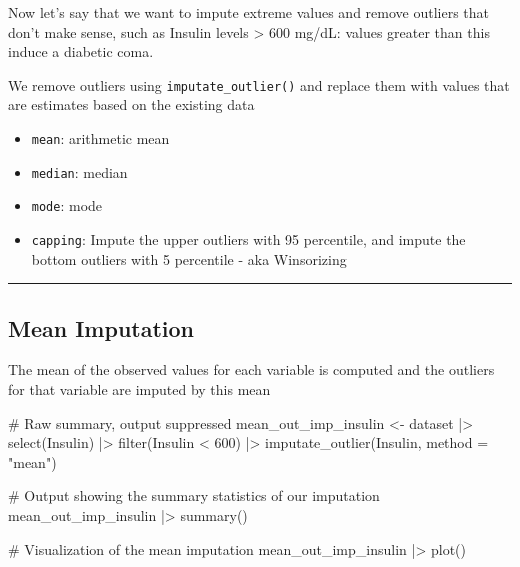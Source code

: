 \documentclass[
  letterpaper,
  DIV=11,
  numbers=noendperiod]{scrreprt}
\newenvironment{Shaded}{\begin{snugshade}}{\end{snugshade}}
\newcommand{\AttributeTok}[1]{\textcolor[rgb]{0.40,0.45,0.13}{#1}}
\newcommand{\CommentTok}[1]{\textcolor[rgb]{0.37,0.37,0.37}{#1}}
\newcommand{\DecValTok}[1]{\textcolor[rgb]{0.68,0.00,0.00}{#1}}
\newcommand{\FunctionTok}[1]{\textcolor[rgb]{0.28,0.35,0.67}{#1}}
\newcommand{\NormalTok}[1]{\textcolor[rgb]{0.00,0.23,0.31}{#1}}
\newcommand{\OtherTok}[1]{\textcolor[rgb]{0.00,0.23,0.31}{#1}}
\newcommand{\SpecialCharTok}[1]{\textcolor[rgb]{0.37,0.37,0.37}{#1}}
\newcommand{\StringTok}[1]{\textcolor[rgb]{0.13,0.47,0.30}{#1}}
\begin{document}
Now let's say that we want to impute extreme values and remove outliers
that don't make sense, such as Insulin levels \textgreater{} 600 mg/dL:
values greater than this induce a diabetic coma.

We remove outliers using \texttt{imputate\_outlier()} and replace them
with values that are estimates based on the existing data

\begin{itemize}
\item
  \texttt{mean}: arithmetic mean
\item
  \texttt{median}: median
\item
  \texttt{mode}: mode
\item
  \texttt{capping}: Impute the upper outliers with 95 percentile, and
  impute the bottom outliers with 5 percentile - aka Winsorizing
\end{itemize}

\begin{center}\rule{0.5\linewidth}{0.5pt}\end{center}

\hypertarget{mean-imputation}{%
\subsection{Mean Imputation}\label{mean-imputation}}

The mean of the observed values for each variable is computed and the
outliers for that variable are imputed by this mean

\begin{Shaded}
\begin{Highlighting}[]
\CommentTok{\# Raw summary, output suppressed}
\NormalTok{mean\_out\_imp\_insulin }\OtherTok{\textless{}{-}}\NormalTok{ dataset }\SpecialCharTok{|\textgreater{}}
  \FunctionTok{select}\NormalTok{(Insulin) }\SpecialCharTok{|\textgreater{}}
  \FunctionTok{filter}\NormalTok{(Insulin }\SpecialCharTok{\textless{}} \DecValTok{600}\NormalTok{) }\SpecialCharTok{|\textgreater{}}
  \FunctionTok{imputate\_outlier}\NormalTok{(Insulin, }\AttributeTok{method =} \StringTok{"mean"}\NormalTok{)}

\CommentTok{\# Output showing the summary statistics of our imputation}
\NormalTok{mean\_out\_imp\_insulin }\SpecialCharTok{|\textgreater{}}
  \FunctionTok{summary}\NormalTok{()}
\end{Highlighting}
\end{Shaded}

\begin{Shaded}
\begin{Highlighting}[]
\CommentTok{\# Visualization of the mean imputation}
\NormalTok{mean\_out\_imp\_insulin }\SpecialCharTok{|\textgreater{}}
  \FunctionTok{plot}\NormalTok{()}
\end{Highlighting}
\end{Shaded}
\end{document}
